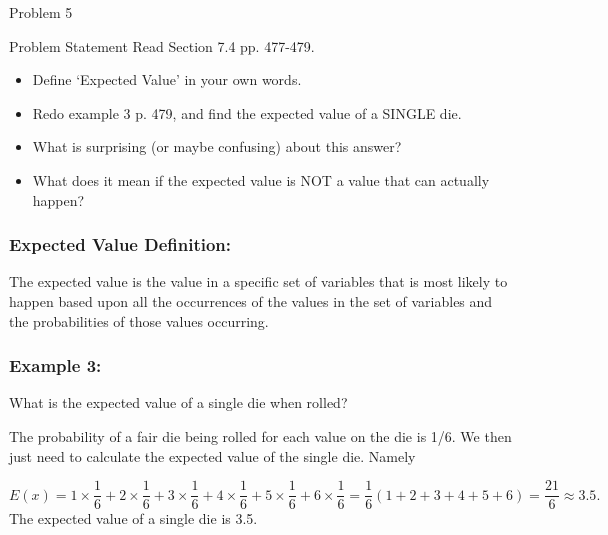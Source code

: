 \begin{problem}{Problem 5}
    \begin{statement}{Problem Statement}
        Read Section 7.4 pp. 477-479.

        \begin{itemize}
            \item Define `Expected Value' in your own words.
            \item Redo example 3 p. 479, and find the expected value of a SINGLE die.
            \item What is surprising (or maybe confusing) about this answer?
            \item What does it mean if the expected value is NOT a value that can actually happen?
        \end{itemize}
    \end{statement}

    \begin{highlight}[Solution]
        \subsubsection*{Expected Value Definition:}

        The expected value is the value in a specific set of variables that is most likely to happen based upon all the occurrences of the values in the set of variables and the probabilities of those
        values occurring. \vspace*{1em}

        \subsubsection*{Example 3:}

        \noindent What is the expected value of a single die when rolled? \vspace*{1em}

        The probability of a fair die being rolled for each value on the die is 1/6. We then just need to calculate the expected value of the single die. Namely

        \setcounter{equation}{0}
        \begin{equation}
            E(x) = 1 \times \frac{1}{6} + 2 \times \frac{1}{6} + 3 \times \frac{1}{6} + 4 \times \frac{1}{6} + 5 \times \frac{1}{6} + 6 \times \frac{1}{6} = \frac{1}{6} (1 + 2 + 3 + 4 + 5 + 6) = \frac{21}{6} \approx 3.5.
        \end{equation}
        The expected value of a single die is 3.5. \vspace*{1em}


\end{highlight}
\end{problem}
